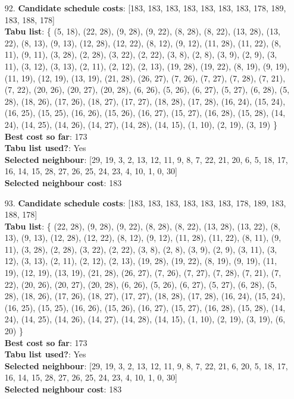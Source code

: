 \documentclass[fleqn]{article}
\begin{document}
\begin{itemize}
    \item[92.] \textbf{Candidate schedule costs}: [183, 183, 183, 183, 183, 183, 183, 178, 189, 183, 188, 178] \\
    \textbf{Tabu list}: \{ (5, 18), (22, 28), (9, 28), (9, 22), (8, 28), (8, 22), (13, 28), (13, 22), (8, 13), (9, 13), (12, 28), (12, 22), (8, 12), (9, 12), (11, 28), (11, 22), (8, 11), (9, 11), (3, 28), (2, 28), (3, 22), (2, 22), (3, 8), (2, 8), (3, 9), (2, 9), (3, 11), (3, 12), (3, 13), (2, 11), (2, 12), (2, 13), (19, 28), (19, 22), (8, 19), (9, 19), (11, 19), (12, 19), (13, 19), (21, 28), (26, 27), (7, 26), (7, 27), (7, 28), (7, 21), (7, 22), (20, 26), (20, 27), (20, 28), (6, 26), (5, 26), (6, 27), (5, 27), (6, 28), (5, 28), (18, 26), (17, 26), (18, 27), (17, 27), (18, 28), (17, 28), (16, 24), (15, 24), (16, 25), (15, 25), (16, 26), (15, 26), (16, 27), (15, 27), (16, 28), (15, 28), (14, 24), (14, 25), (14, 26), (14, 27), (14, 28), (14, 15), (1, 10), (2, 19), (3, 19) \} \\
    \textbf{Best cost so far}: 173 \\
    \textbf{Tabu list used?}: Yes \\
    \textbf{Selected neighbour}: [29, 19, 3, 2, 13, 12, 11, 9, 8, 7, 22, 21, 20, 6, 5, 18, 17, 16, 14, 15, 28, 27, 26, 25, 24, 23, 4, 10, 1, 0, 30] \\
    \textbf{Selected neighbour cost}: 183
      

    \item[93.] \textbf{Candidate schedule costs}: [183, 183, 183, 183, 183, 183, 178, 189, 183, 188, 178] \\
    \textbf{Tabu list}: \{ (22, 28), (9, 28), (9, 22), (8, 28), (8, 22), (13, 28), (13, 22), (8, 13), (9, 13), (12, 28), (12, 22), (8, 12), (9, 12), (11, 28), (11, 22), (8, 11), (9, 11), (3, 28), (2, 28), (3, 22), (2, 22), (3, 8), (2, 8), (3, 9), (2, 9), (3, 11), (3, 12), (3, 13), (2, 11), (2, 12), (2, 13), (19, 28), (19, 22), (8, 19), (9, 19), (11, 19), (12, 19), (13, 19), (21, 28), (26, 27), (7, 26), (7, 27), (7, 28), (7, 21), (7, 22), (20, 26), (20, 27), (20, 28), (6, 26), (5, 26), (6, 27), (5, 27), (6, 28), (5, 28), (18, 26), (17, 26), (18, 27), (17, 27), (18, 28), (17, 28), (16, 24), (15, 24), (16, 25), (15, 25), (16, 26), (15, 26), (16, 27), (15, 27), (16, 28), (15, 28), (14, 24), (14, 25), (14, 26), (14, 27), (14, 28), (14, 15), (1, 10), (2, 19), (3, 19), (6, 20) \} \\
    \textbf{Best cost so far}: 173 \\
    \textbf{Tabu list used?}: Yes \\
    \textbf{Selected neighbour}: [29, 19, 3, 2, 13, 12, 11, 9, 8, 7, 22, 21, 6, 20, 5, 18, 17, 16, 14, 15, 28, 27, 26, 25, 24, 23, 4, 10, 1, 0, 30] \\
    \textbf{Selected neighbour cost}: 183
      


\end{itemize}
\end{document}
